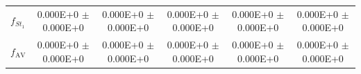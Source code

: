 \documentclass[conference]{IEEEtran}
\begin{document}
\begin{table}[]
\begin{tabular}{|l|c|c|c|c|c|}
		$f_{\textit{St}_1}$ & \cellcolor[HTML]{FFFFFF}0.000E+0 $\pm$ 0.000E+0                        & 0.000E+0 $\pm$ 0.000E+0                                                & 0.000E+0 $\pm$ 0.000E+0                                                & 0.000E+0 $\pm$ 0.000E+0                                                & 0.000E+0 $\pm$ 0.000E+0                                                \\
		$f_{\text{AV}}$     & 0.000E+0 $\pm$ 0.000E+0                                                & 0.000E+0 $\pm$ 0.000E+0                                                & 0.000E+0 $\pm$ 0.000E+0                                                & 0.000E+0 $\pm$ 0.000E+0                                                & 0.000E+0 $\pm$ 0.000E+0                                                \\ \hline
	\end{tabular}
\end{table}
\end{document}
